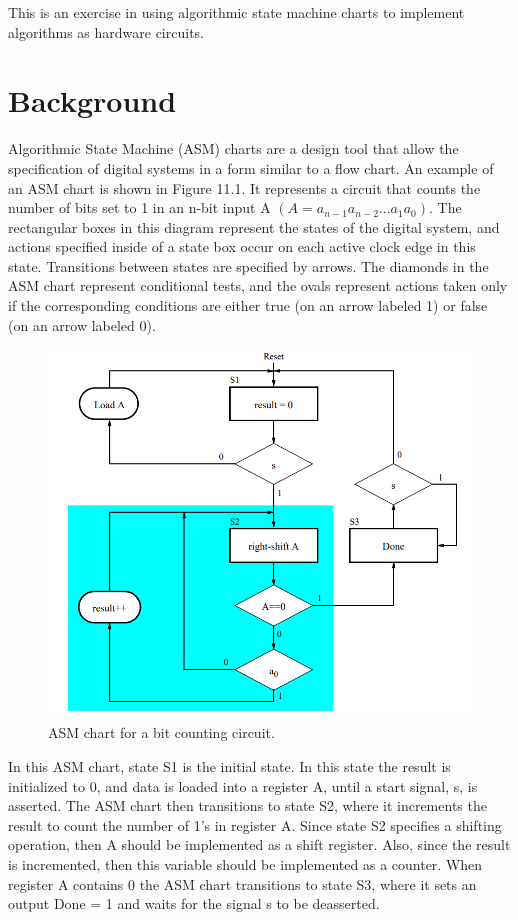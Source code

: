 This is an exercise in using algorithmic state machine charts to implement algorithms as hardware circuits.
\section{Background}
Algorithmic State Machine (ASM) charts are a design tool that allow the specification of digital systems in a form similar to a flow chart. An example of an ASM chart is shown in Figure 11.1. It represents a circuit that counts the number of bits set to 1 in an n-bit input A $(A = a_{n-1}a_{n-2}. . .a_1a_0)$. The rectangular boxes in this diagram represent the states of the digital system, and actions specified inside of a state box occur on each active clock edge in this state. Transitions between states are specified by arrows. The diamonds in the ASM chart represent conditional tests, and the ovals represent actions taken only if the corresponding conditions are either true (on an arrow labeled 1) or false (on an arrow labeled 0).\\
\begin{figure}[h]
    \centering
    \includegraphics[scale = 0.65]{source/picture/Lab11/11.png}
    \caption{ASM chart for a bit counting circuit.}
\end{figure}
In this ASM chart, state S1 is the initial state. In this state the result is initialized to 0, and data is loaded into a register A, until a start signal, s, is asserted. The ASM chart then transitions to state S2, where it increments the result to count the number of 1’s in register A. Since state S2 specifies a shifting operation, then A should be implemented as a shift register. Also, since the result is incremented, then this variable should be implemented as a counter. When register A contains 0 the ASM chart transitions to state S3, where it sets an output Done = 1 and waits for the signal s to be deasserted.



